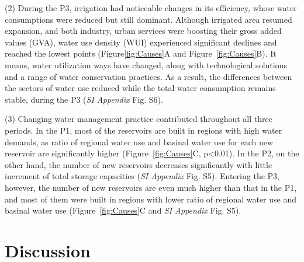 \documentclass[9pt, twocolumn, twoside, lineno]{pnas-new}
\begin{document}
(2) During the P3, irrigation had noticeable changes in its efficiency, whose water consumptions were reduced but still dominant. Although irrigated area resumed expansion, and both industry, urban services were boosting their gross added values (GVA), water use density (WUI) experienced significant declines and reached the lowest points (Figure\ref{fig:Causes}A and Figure~\ref{fig:Causes}B). It means, water utilization ways  have changed, along with technological solutions and a range of water conservation practices. As a result, the differences between the sectors of water use reduced while the total water consumption remains stable, during the P3 (\textit{SI Appendix} Fig. S6).

(3) Changing water management practice contributed throughout all three periods. In the P1, most of the reservoirs are built in regions with high water demands, as ratio of regional water use and basinal water use for each new reservoir are significantly higher (Figure~\ref{fig:Causes}C, p<0.01). In the P2, on the other hand, the number of new reservoirs decreases significantly with little increment of total storage capacities (\textit{SI Appendix} Fig. S5). Entering the P3, however, the number of new reservoirs are even much higher than that in the P1, and most of them were built in regions with lower ratio of regional water use and basinal water use (Figure~\ref{fig:Causes}C and \textit{SI Appendix} Fig. S5).

\section*{Discussion}
\end{document}
